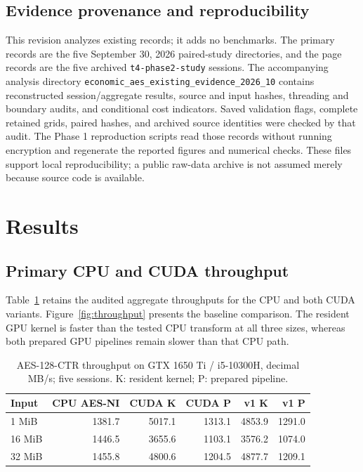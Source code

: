 \documentclass[11pt,a4paper]{article}
\begin{document}
\subsection{Evidence provenance and reproducibility}
This revision analyzes existing records; it adds no benchmarks. The primary records are the five September 30, 2026 paired-study directories, and the page records are the five archived \texttt{t4-phase2-study} sessions. The accompanying analysis directory \texttt{economic\_aes\_existing\_evidence\_2026\_10} contains reconstructed session/aggregate results, source and input hashes, threading and boundary audits, and conditional cost indicators. Saved validation flags, complete retained grids, paired hashes, and archived source identities were checked by that audit. The Phase 1 reproduction scripts read those records without running encryption and regenerate the reported figures and numerical checks. These files support local reproducibility; a public raw-data archive is not assumed merely because source code is available.

\section{Results}
\subsection{Primary CPU and CUDA throughput}
Table~\ref{tab:primary} retains the audited aggregate throughputs for the CPU and both CUDA variants. Figure~\ref{fig:throughput} presents the baseline comparison. The resident GPU kernel is faster than the tested CPU transform at all three sizes, whereas both prepared GPU pipelines remain slower than that CPU path.

\begin{table}[htbp]\centering\small
\caption{AES-128-CTR throughput on GTX 1650 Ti / i5-10300H, decimal MB/s; five sessions. K: resident kernel; P: prepared pipeline.}\label{tab:primary}
\setlength{\tabcolsep}{4pt}
\begin{tabular}{lrrrrr}\toprule
Input & CPU AES-NI & CUDA K & CUDA P & v1 K & v1 P\\\midrule
1 MiB & 1381.7 & 5017.1 & 1313.1 & 4853.9 & 1291.0\\
16 MiB & 1446.5 & 3655.6 & 1103.1 & 3576.2 & 1074.0\\
32 MiB & 1455.8 & 4800.6 & 1204.5 & 4877.7 & 1209.1\\\bottomrule
\end{tabular}
\end{table}
\end{document}

